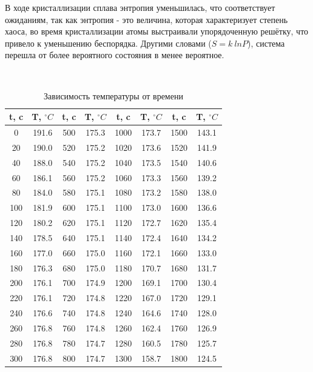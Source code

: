 \documentclass[a4paper]{article}
\begin{document}
В ходе кристаллизации сплава энтропия уменьшилась, что соответствует ожиданиям, так как энтропия - это величина, которая характеризует степень хаоса, во время кристаллизации атомы выстраивали упорядоченную решётку, что привело к уменьшению беспорядка. Другими словами ($S=k\:lnP$), система перешла от более вероятного состояния в менее вероятное.


\newpage
\setlength\doublerulesep{0.7pt}
\begin{table}[htb]
	\hypertarget{table}{}\\
	\caption{Зависимость температуры от времени}
	\begin{tabular}{c|c||c|c||c|c||c|c}
		t, c& T, $ ^\circ C $&t, c& T, $ ^\circ C $&t, c& T, $ ^\circ C $&t, c& T, $ ^\circ C $\\
		\hline\hline
		\cellcolor{yellow}0 & \cellcolor{yellow}191.6	&	500	&	175.3	&	1000	&	173.7	&	1500	&	143.1	\\
		20	&	190.0	&	520	&	175.2	&	1020	&	173.6	&	1520	&	141.9	\\
		40	&	188.0	&	540	&	175.2	&	1040	&	173.5	&	1540	&	140.6	\\
		60	&	186.1	&	560	&	175.2	&	1060	&	173.3	&	1560	&	139.2	\\
		80	&	184.0	&	580	&	175.1	&	1080	&	173.2	&	1580	&	138.0	\\
		100	&	181.9	&	600	&	175.1	&	1100	&	173.0	&	1600	&	136.6	\\
		120	&	180.2	&	620	&	175.1	&	1120	&	172.7	&	1620	&	135.4	\\
		140	&	178.5	&	640	&	175.1	&	1140	&	172.4	&	1640	&	134.2	\\
		160	&	177.0	&	660	&	175.0	&	\cellcolor{yellow}1160&	\cellcolor{yellow}172.1	&	1660	&	133.0	\\
		180	&	176.3	&	680	&	175.0	&	1180	&	170.7	&	1680	&	131.7	\\
		\cellcolor{yellow}200&	\cellcolor{yellow}176.1	&	700	&	174.9	&	1200	&	169.1	&	1700	&	130.4	\\
		220	&	176.1	&	720	&	174.8	&	1220	&	167.0	&	1720	&	129.1	\\
		240	&	176.6	&	740	&	174.8	&	1240	&	164.6	&	1740	&	128.0	\\
		260	&	176.8	&	760	&	174.8	&	1260	&	162.4	&	1760	&	126.9	\\
		280	&	176.8	&	780	&	174.7	&	1280	&	160.5	&	1780	&	125.7	\\
		300	&	176.8	&	800	&	174.7	&	1300	&	158.7	&	1800	&	124.5	\\

\end{tabular}
\end{table}
\end{document}
